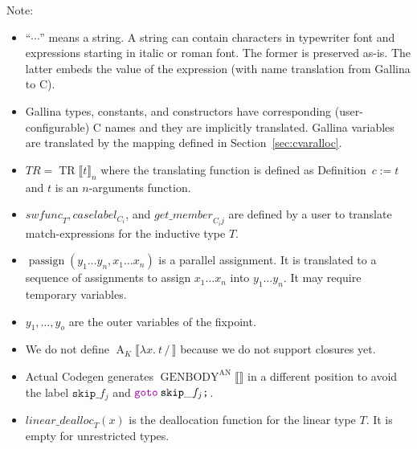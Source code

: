 \documentclass[a4paper,fleqn]{article}
\def\gallina{\textrm{Gallina}}
\def\codegen{\textrm{Codegen}}
\newcommand{\kwDefinition}{\mbox{\color{myviolet}\ttfamily Definition}}
\newcommand{\kwmatch}{\mbox{\color{mygreen}\ttfamily match}}
\newcommand{\lam}[2]{\lambda #1.\:#2}
\newcommand{\BRA}[1]{\llbracket #1 \rrbracket}
\DeclareMathOperator{\genbody}{GENBODY}
\newcommand{\genbodyan}[1]{\genbody^\mathrm{AN}\BRA{#1}}
\DeclareMathOperator{\TRop}{TR}
\newcommand{\TR}[2]{\TRop\BRA{#1}_{#2}}
\newcommand{\tr}{\mathit{TR}}
\newcommand{\dq}[1]{\text{``}#1\text{''}}
\newcommand{\ttsemi}{\texttt{;}}
\newcommand{\kwgoto}{\mbox{\color{myviolet}\ttfamily goto}}
\newcommand{\secref}[1]{Section~\ref{#1}}
\DeclareMathOperator{\passign}{passign}
\DeclareMathOperator{\Aop}{A}
\newcommand{\A}[3]{\Aop_{#1}\BRA{#2\,/\,#3}}
\begin{document}
{\small Note:
\begin{itemize}
  \item $\dq{\cdots}$ means a string.
    A string can contain characters in typewriter font and expressions starting in italic or roman font.
    The former is preserved as-is.
    The latter embeds the value of the expression (with name translation from \gallina{} to C).
  \item \gallina{} types, constants, and constructors have corresponding (user-configurable) C names and they are implicitly translated.
    \gallina{} variables are translated by the mapping defined in \secref{sec:cvaralloc}.
  \item $\tr = \TR{t}{n}$ where the translating function is defined as \kwDefinition~$c := t$ and $t$ is an $n$-arguments function.
  \item $\mathit{swfunc}_T, \mathit{caselabel}_{C_i}$, and $\mathit{get\_member}_{C_i j}$ are defined by a user to translate \kwmatch-expressions for the inductive type $T$.
  \item $\passign(y_1\ldots y_n, x_1\ldots x_n)$ is a parallel assignment. It is translated to a sequence of assignments to assign $x_1\ldots x_n$ into $y_1\ldots y_n$.  It may require temporary variables.
  \item $y_1,\dotsc,y_o$ are the outer variables of the fixpoint.
  \item We do not define $\A{K}{\lam{x}{t}}{}$ because we do not support closures yet.
  \item Actual \codegen{} generates $\genbodyan{}$ in a different position to avoid the label $\mathtt{skip\_}f_j$ and $\kwgoto\:\mathtt{skip\_}f_j\ttsemi$.
  \item $\mathit{linear\_dealloc}_{T}(x)$ is the deallocation function for the linear type $T$.  It is empty for unrestricted types.
\end{itemize}}
\end{document}
